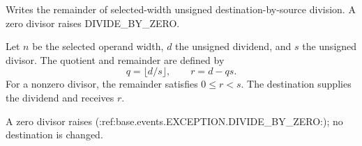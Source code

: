 Writes the remainder of selected-width unsigned destination-by-source division. A zero divisor raises DIVIDE\_BY\_ZERO.

Let \(n\) be the selected operand width, \(d\) the unsigned dividend, and \(s\) the unsigned divisor. The quotient and remainder are defined by
\[
  q = \lfloor d/s \rfloor,
  \qquad r = d - qs .
\]
For a nonzero divisor, the remainder satisfies \(0 \le r < s\). The destination supplies the dividend and receives \(r\).

A zero divisor raises (:ref:base.events.EXCEPTION.DIVIDE_BY_ZERO:); no destination is changed.
